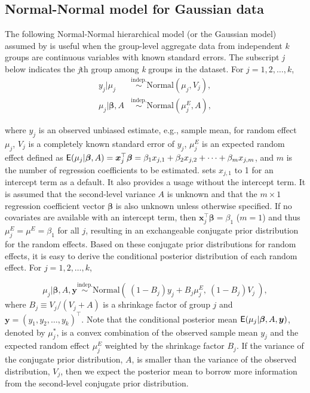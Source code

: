 \documentclass[article]{jss}
\begin{document}
\subsection[Normal-Normal]{Normal-Normal model for Gaussian data}
The following Normal-Normal hierarchical model (or the Gaussian model) assumed by  is useful when the group-level aggregate data from independent $k$ groups are continuous variables with known standard errors. The subscript \emph{j} below indicates the \emph{j}th group among \emph{k} groups in the dataset. For $j=1, 2, \ldots, k$, 
\begin{align}
y_{j}\vert \mu_{j} & \stackrel{\textrm{indep.}}{\sim} \textrm{Normal}(\mu_{j}, V_{j}),\label{normalobs}\\
\mu_{j}\vert \boldsymbol{\beta}, A & \stackrel{\textrm{indep.}}{\sim} \textrm{Normal}(\mu^E_{j}, A),\label{normalprior}
\end{align}


where $y_j$ is an observed unbiased estimate, e.g., sample mean, for random effect $\mu_j$, $V_{j}$ is a completely known standard error of $y_j$, $\mu^E_{j}$ is an expected random effect defined as $\mathsf{E}(\mu_j\vert \boldsymbol{\beta}, A) = \boldsymbol{x}_j^\top \boldsymbol{\beta}=\beta_{1}x_{j, 1}+\beta_{2}x_{j, 2} + \cdots + \beta_{m}x_{j, m}$, and $m$ is the number of regression coefficients to be estimated.  sets $x_{j, 1}$ to 1 for an intercept term as a default. It also provides a usage without the intercept term.  It is assumed that the second-level variance $A$ is unknown and that the $m\times1$ regression coefficient vector $\boldsymbol{\beta}$ is also unknown unless otherwise specified. If no covariates are available with an intercept term, then $\boldsymbol{x}_j^\top \boldsymbol{\beta}=\beta_1$ ($m=1$) and thus $\mu^E_{j}=\mu^E=\beta_1$ for all $j$, resulting in an exchangeable conjugate prior distribution for the random effects.  Based on these conjugate prior distributions for random effects, it is easy to derive the conditional posterior distribution of each random effect. For $j=1, 2, \ldots, k$,

\begin{equation} \label{normalpost}
\mu_{j}\vert  \boldsymbol{\beta}, A, \boldsymbol{y} \stackrel{\textrm{indep.}}{\sim}\textrm{Normal}(~(1-B_{j})y_{j} + B_{j}\mu^E_{j},~(1-B_{j})V_{j}~),
\end{equation}
where $B_{j}\equiv V_{j}/(V_{j} + A)$ is a shrinkage factor of group $j$ and $\boldsymbol{y}=(y_1, y_2, \ldots, y_k)^\top$. Note that the conditional posterior mean $\mathsf{E}(\mu_{j}\vert \boldsymbol{\beta}, A, \boldsymbol{y} )$, denoted by $\mu^\ast_j$,  is a convex combination of the observed sample mean $y_j$ and the expected random effect $\mu^E_j$ weighted by the shrinkage factor $B_j$. If the variance of the conjugate prior distribution, $A$, is smaller than the variance of the observed distribution, $V_j$, then we expect the posterior mean to borrow more information from the second-level conjugate prior distribution.
\end{document}
